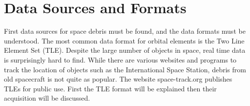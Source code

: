 \documentclass[12pt]{article}
\begin{document}

	
	\newpage
	\section{Data Sources and Formats}
	
	
	
	First data sources for space debris must be found, and the data formats must be understood. The most common data format for orbital elements is the Two Line Element Set (TLE). Despite the large number of objects in space, real time data is surprisingly hard to find. While there are various websites and programs to track the location of objects such as the International Space Station, debris from old spacecraft is not quite as popular. The website space-track.org publishes TLEs for public use. First the TLE format will be explained then their acquisition will be discussed. 
	
\end{document}
